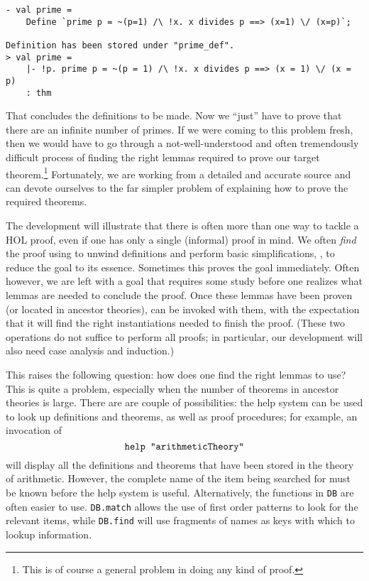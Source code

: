 \begin{session}\begin{verbatim}
- val prime =
    Define `prime p = ~(p=1) /\ !x. x divides p ==> (x=1) \/ (x=p)`;

Definition has been stored under "prime_def".
> val prime =
    |- !p. prime p = ~(p = 1) /\ !x. x divides p ==> (x = 1) \/ (x = p)
    : thm
\end{verbatim}\end{session}

That concludes the definitions to be made. Now we ``just'' have to prove
that there are an infinite number of primes. If we were coming to this
problem fresh, then we would have to go through a not-well-understood
and often tremendously difficult process of finding the right lemmas
required to prove our target theorem.\footnote{This is of course a
general problem in doing any kind of proof.} Fortunately, we are working
from a detailed and accurate source and can devote ourselves to the far
simpler problem of explaining how to prove the required theorems.

The development will illustrate that there is often more than one way to
tackle a HOL proof, even if one has only a single (informal) proof in
mind. We often \emph{find} the proof using  to unwind
definitions and perform basic simplifications, \ie, to reduce the goal
to its essence. Sometimes this proves the goal immediately. Often
however, we are left with a goal that requires some study before one
realizes what lemmas are needed to conclude the proof. Once these lemmas
have been proven (or located in ancestor theories),  can
be invoked with them, with the expectation that it will find the right
instantiations needed to finish the proof. (These two operations do not
suffice to perform all proofs; in particular, our development will also need
case analysis and induction.)

This raises the following question: how does one find the right lemmas
to use? This is quite a problem, especially when the number of
theorems in ancestor theories is large. There are are couple of
possibilities: the help system can be used to look up definitions and
theorems, as well as proof procedures; for example, an invocation of
\[
\mbox{\texttt{help "arithmeticTheory"}}
\]
will display all the definitions and theorems that have been stored in
the theory of arithmetic. However, the complete name of the item being
searched for must be known before the help system is useful.
Alternatively, the functions in \verb+DB+ are often easier to use.
\verb+DB.match+ allows the use of first order patterns to look for the
relevant items, while \verb+DB.find+ will use fragments of names as
keys with which to lookup information.

